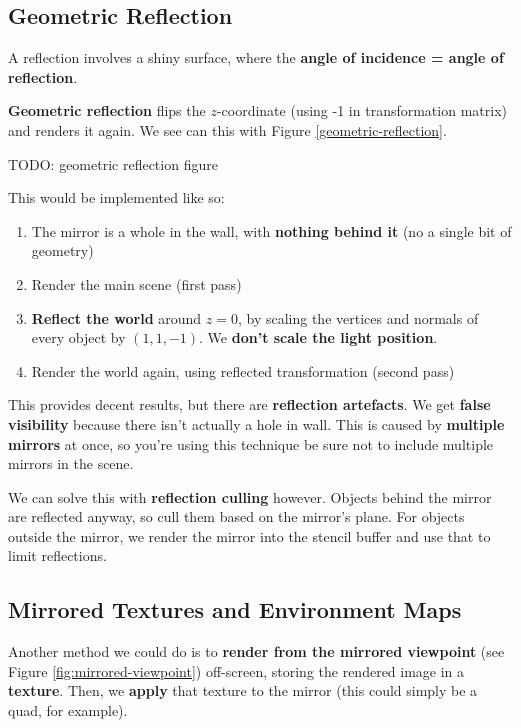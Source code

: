 \documentclass{article}
\begin{document}
\subsection{Geometric Reflection}

A reflection involves a shiny surface, where the \textbf{angle of incidence = angle of reflection}.

\textbf{Geometric reflection} flips the $z$-coordinate (using -1 in transformation matrix) and renders it again. We see can this with Figure \ref{geometric-reflection}.

TODO: geometric reflection figure

This would be implemented like so:
\begin{enumerate}
	\item The mirror is a whole in the wall, with \textbf{nothing behind it} (no a single bit of geometry)
	\item Render the main scene (first pass)
	\item \textbf{Reflect the world} around $z = 0$, by scaling the vertices and normals of every object by $(1, 1, -1)$. We \textbf{don't scale the light position}. 
	\item Render the world again, using reflected transformation (second pass)
\end{enumerate}

This provides decent results, but there are \textbf{reflection artefacts}. We get \textbf{false visibility} because there isn't actually a hole in wall. This is caused by \textbf{multiple mirrors} at once, so you're using this technique be sure not to include multiple mirrors in the scene. 

We can solve this with \textbf{reflection culling} however. Objects behind the mirror are reflected anyway, so cull them based on the mirror's plane. For objects outside the mirror, we render the mirror into the stencil buffer and use that to limit reflections.

\subsection{Mirrored Textures and Environment Maps}

Another method we could do is  to \textbf{render from the mirrored viewpoint} (see Figure \ref{fig:mirrored-viewpoint}) off-screen, storing the rendered image in a \textbf{texture}. Then, we \textbf{apply} that texture to the mirror (this could simply be a quad, for example).
\end{document}
